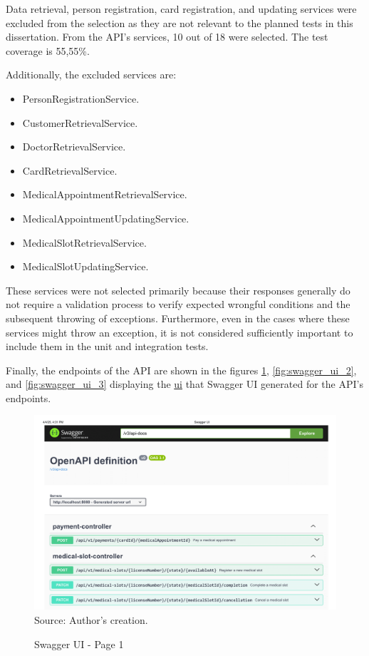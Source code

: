 Data retrieval, person registration, card registration, and updating services were excluded from the selection as they are not relevant to the planned tests in this dissertation. From the API's services, 10 out of 18 were selected. The test coverage is 55,55\%. 

Additionally, the excluded services are:

\begin{itemize}
    \item PersonRegistrationService.
    \item CustomerRetrievalService.
    \item DoctorRetrievalService.
    \item CardRetrievalService.
    \item MedicalAppointmentRetrievalService.
    \item MedicalAppointmentUpdatingService.
    \item MedicalSlotRetrievalService.
    \item MedicalSlotUpdatingService.
\end{itemize}

These services were not selected primarily because their responses generally do not require a validation process to verify expected wrongful conditions and the subsequent throwing of exceptions. Furthermore, even in the cases where these services might throw an exception, it is not considered sufficiently important to include them in the unit and integration tests.

Finally, the endpoints of the API are shown in the figures \ref{fig:swagger_ui_1}, \ref{fig:swagger_ui_2}, and \ref{fig:swagger_ui_3} 
displaying the \hyperref[appendix:glossary]{ui} that Swagger UI generated for the API's endpoints.

\begin{landscape}
    \begin{figure}[H]
        \centering
        \caption{Swagger UI - Page 1}
        \includegraphics[width=0.83\linewidth]{figures/Swagger UI-1.png}
        \label{fig:swagger_ui_1}
        \\ \footnotesize Source: Author's creation.
    \end{figure}
\end{landscape}

